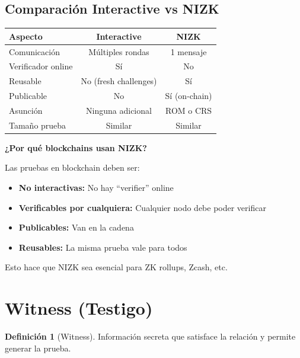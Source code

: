 \documentclass[11pt,a4paper,twoside,openright]{book}
\theoremstyle{definition}
\newtheorem{definition}{Definición}[chapter]
\theoremstyle{plain}
\theoremstyle{remark}
\begin{document}
\subsection{Comparación Interactive vs NIZK}

\begin{center}
\begin{tabular}{lcc}
\toprule
\textbf{Aspecto} & \textbf{Interactive} & \textbf{NIZK} \\
\midrule
Comunicación & Múltiples rondas & 1 mensaje \\
Verificador online & Sí & No \\
Reusable & No (fresh challenges) & Sí \\
Publicable & No & Sí (on-chain) \\
Asunción & Ninguna adicional & ROM o CRS \\
Tamaño prueba & Similar & Similar \\
\bottomrule
\end{tabular}
\end{center}

\begin{keyidea}
\textbf{¿Por qué blockchains usan NIZK?}

Las pruebas en blockchain deben ser:
\begin{itemize}
    \item \textbf{No interactivas:} No hay ``verifier'' online
    \item \textbf{Verificables por cualquiera:} Cualquier nodo debe poder verificar
    \item \textbf{Publicables:} Van en la cadena
    \item \textbf{Reusables:} La misma prueba vale para todos
\end{itemize}

Esto hace que NIZK sea esencial para ZK rollups, Zcash, etc.
\end{keyidea}

\section{Witness (Testigo)}

\begin{definition}[Witness]
Información secreta que satisface la relación y permite generar la prueba.
\end{definition}
\end{document}
